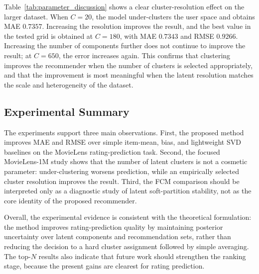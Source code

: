 \documentclass{article}
\theoremstyle{plain}
\theoremstyle{definition}
\theoremstyle{remark}
\begin{document}
Table~\ref{tab:parameter_discussion} shows a clear cluster-resolution effect on the larger dataset. When \(C=20\), the model under-clusters the user space and obtains MAE \(0.7357\). Increasing the resolution improves the result, and the best value in the tested grid is obtained at \(C=180\), with MAE \(0.7343\) and RMSE \(0.9266\). Increasing the number of components further does not continue to improve the result; at \(C=650\), the error increases again. This confirms that clustering improves the recommender when the number of clusters is selected appropriately, and that the improvement is most meaningful when the latent resolution matches the scale and heterogeneity of the dataset.

\subsection{Experimental Summary}
\label{subsec:experimental_summary}

The experiments support three main observations. First, the proposed method improves MAE and RMSE over simple item-mean, bias, and lightweight SVD baselines on the MovieLens rating-prediction task. Second, the focused MovieLens-1M study shows that the number of latent clusters is not a cosmetic parameter: under-clustering worsens prediction, while an empirically selected cluster resolution improves the result. Third, the FCM comparison should be interpreted only as a diagnostic study of latent soft-partition stability, not as the core identity of the proposed recommender.

Overall, the experimental evidence is consistent with the theoretical formulation: the method improves rating-prediction quality by maintaining posterior uncertainty over latent components and recommendation sets, rather than reducing the decision to a hard cluster assignment followed by simple averaging. The top-\(N\) results also indicate that future work should strengthen the ranking stage, because the present gains are clearest for rating prediction.
\end{document}

